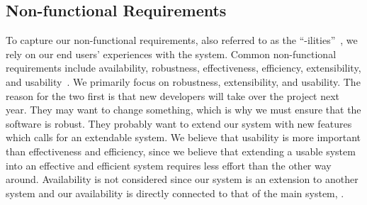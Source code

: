 \subsection{Non-functional Requirements}
To capture our non-functional requirements, also referred to as the ``-ilities''~\cite[p.288]{Larman04}, we rely on our end users' experiences with the system.
Common non-functional requirements include availability, robustness, effectiveness, efficiency, extensibility, and usability~\cite[sec.~9.1]{roedeaalborg}.
We primarily focus on robustness, extensibility, and usability.
The reason for the two first is that new developers will take over the project next year. 
They may want to change something, which is why we must ensure that the software is robust. 
They probably want to extend our system with new features which calls for an extendable system.
We believe that usability is more important than effectiveness and efficiency, since we believe that extending a usable system into an effective and efficient system requires less effort than the other way around.
Availability is not considered since our system is an extension to another system and our availability is directly connected to that of the main system, \moodle{}.


\begin{comment}
In the interview described in \appref{sec:lene} we learned that there is a need for having a concept of project groups in \moodle{}.  to enhance communication by sending messages from the \admpers{} to project groups through \moodle{}.
This evolves into two backlog items; integrate the concept of project groups into \moodle{} and allow the administrative personnel to post messages to the project group.
The former is represented as a backlog item which can be seen in \figref{fig:productbacklog}.
The latter is implemented by the \supervisorgroup{}.
\end{comment}

\FloatBarrier

